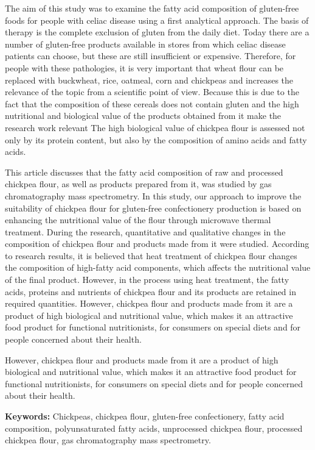 The aim of this study was to examine the fatty acid composition of
gluten-free foods for people with celiac disease using a first
analytical approach. The basis of therapy is the complete exclusion of
gluten from the daily diet. Today there are a number of gluten-free
products available in stores from which celiac disease patients can
choose, but these are still insufficient or expensive. Therefore, for
people with these pathologies, it is very important that wheat flour can
be replaced with buckwheat, rice, oatmeal, corn and chickpeas and
increases the relevance of the topic from a scientific point of view.
Because this is due to the fact that the composition of these cereals
does not contain gluten and the high nutritional and biological value of
the products obtained from it make the research work relevant The high
biological value of chickpea flour is assessed not only by its protein
content, but also by the composition of amino acids and fatty acids.

This article discusses that the fatty acid composition of raw and
processed chickpea flour, as well as products prepared from it, was
studied by gas chromatography mass spectrometry. In this study, our
approach to improve the suitability of chickpea flour for gluten-free
confectionery production is based on enhancing the nutritional value of
the flour through microwave thermal treatment. During the research,
quantitative and qualitative changes in the composition of chickpea
flour and products made from it were studied. According to research
results, it is believed that heat treatment of chickpea flour changes
the composition of high-fatty acid components, which affects the
nutritional value of the final product. However, in the process using
heat treatment, the fatty acids, proteins and nutrients of chickpea
flour and its products are retained in required quantities. However,
chickpea flour and products made from it are a product of high
biological and nutritional value, which makes it an attractive food
product for functional nutritionists, for consumers on special diets and
for people concerned about their health.

However, chickpea flour and products made from it are a product of high
biological and nutritional value, which makes it an attractive food
product for functional nutritionists, for consumers on special diets and
for people concerned about their health.

{\bfseries Keywords:} Chickpeas, chickpea flour, gluten-free confectionery,
fatty acid composition, polyunsaturated fatty acids, unprocessed
chickpea flour, processed chickpea flour, gas chromatography mass
spectrometry.

